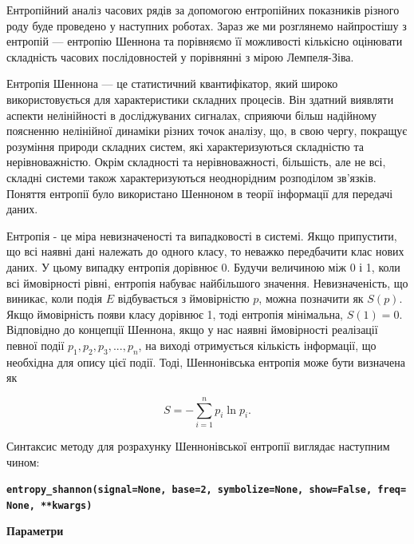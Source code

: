 \documentclass[
  letterpaper,
]{report}
\begin{document}
Ентропійний аналіз часових рядів за допомогою ентропійних показників
різного роду буде проведено у наступних роботах. Зараз же ми розглянемо
найпростішу з ентропій --- ентропію Шеннона та порівняємо її можливості
кількісно оцінювати складність часових послідовностей у порівнянні з
мірою Лемпеля-Зіва.

Ентропія Шеннона --- це статистичний квантифікатор, який широко
використовується для характеристики складних процесів. Він здатний
виявляти аспекти нелінійності в досліджуваних сигналах, сприяючи більш
надійному поясненню нелінійної динаміки різних точок аналізу, що, в свою
чергу, покращує розуміння природи складних систем, які характеризуються
складністю та нерівноважністю. Окрім складності та нерівноважності,
більшість, але не всі, складні системи також характеризуються
неоднорідним розподілом зв'язків. Поняття ентропії було використано
Шенноном в теорії інформації для передачі даних.

Ентропія - це міра невизначеності та випадковості в системі. Якщо
припустити, що всі наявні дані належать до одного класу, то неважко
передбачити клас нових даних. У цьому випадку ентропія дорівнює 0.
Будучи величиною між 0 і 1, коли всі ймовірності рівні, ентропія набуває
найбільшого значення. Невизначеність, що виникає, коли подія \(E\)
відбувається з ймовірністю \(p\), можна позначити як \(S(p)\). Якщо
ймовірність появи класу дорівнює 1, тоді ентропія мінімальна,
\(S(1) = 0\). Відповідно до концепції Шеннона, якщо у нас наявні
ймовірності реалізації певної події \(p_1, p_2, p_3, ..., p_n\), на
виході отримується кількість інформації, що необхідна для опису цієї
події. Тоді, Шеннонівська ентропія може бути визначена як

\[
S = -\sum_{i=1}^{n}p_i \ln p_{i}.  
\]

Синтаксис методу для розрахунку Шеннонівської ентропії виглядає
наступним чином:

\textbf{\texttt{entropy\_shannon(signal=None,\ base=2,\ symbolize=None,\ show=False,\ freq=None,\ **kwargs)}}

\textbf{Параметри}
\end{document}
